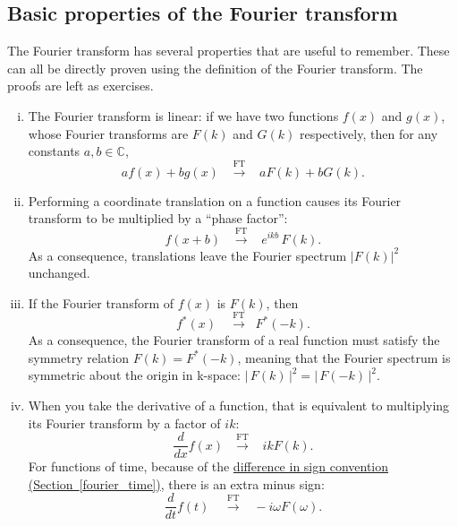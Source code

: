 \documentclass[10pt,a4paper]{article}
\begin{document}
\subsection{Basic properties of the Fourier transform}
\label{fourier-properties}

The Fourier transform has several properties that are useful to
remember. These can all be directly proven using the definition of the
Fourier transform.  The proofs are left as exercises.

\begin{enumerate}[(i)]
\item 
The Fourier transform is linear: if we have two functions $f(x)$ and
$g(x)$, whose Fourier transforms are $F(k)$ and $G(k)$ respectively,
then for any constants $a, b \in \mathbb{C}$,
\begin{equation}
a f(x) + b g(x) \;\;\;  \overset{\mathrm{FT}}{\longrightarrow} \;\;\; a F(k) + b G(k).
\end{equation}

\item
Performing a coordinate translation on a function causes its Fourier
transform to be multiplied by a ``phase factor'':
\begin{equation}
f(x+b) \;\;\;  \overset{\mathrm{FT}}{\longrightarrow} \;\;\; e^{ikb} \, F(k).
\end{equation}
As a consequence, translations leave the Fourier spectrum $|F(k)|^2$
unchanged.

\item
If the Fourier transform of $f(x)$ is $F(k)$, then
\begin{equation}
f^*(x) \quad  \overset{\mathrm{FT}}{\longrightarrow} \;\; F^*(-k).
\end{equation}
As a consequence, the Fourier transform of a real function must
satisfy the symmetry relation $F(k) = F^*(-k)$, meaning that the
Fourier spectrum is symmetric about the origin in k-space:
$\big|\,F(k)\,\big|^2 = \big|\,F(-k)\,\big|^2.$

\item
When you take the derivative of a function, that is equivalent to
multiplying its Fourier transform by a factor of $ik$:
\begin{equation}
\frac{d}{dx} f(x) \,\;\;  \overset{\mathrm{FT}}{\longrightarrow} \;\;\; ik F(k).
\end{equation}
For functions of time, because of the
\hyperref[fourier_time]{difference in sign convention
  (Section~\ref{fourier_time})}, there is an extra minus sign:
\begin{equation}
  \frac{d}{dt} f(t) \;\;\;\;  \overset{\mathrm{FT}}{\longrightarrow} \;\;\; -i\omega F(\omega).
\end{equation}
\end{enumerate}
\end{document}
